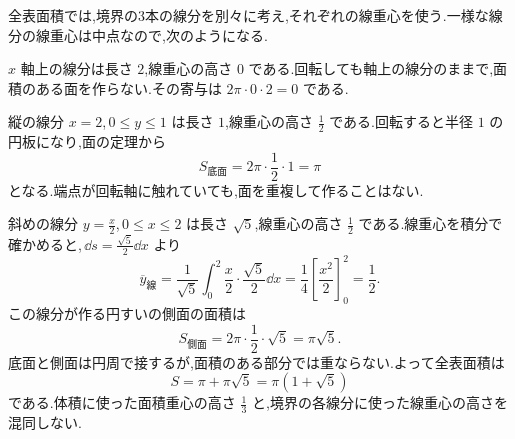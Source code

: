 全表面積では,境界の3本の線分を別々に考え,それぞれの線重心を使う.一様な線分の線重心は中点なので,次のようになる.

$x$ 軸上の線分は長さ $2$,線重心の高さ $0$ である.回転しても軸上の線分のままで,面積のある面を作らない.その寄与は $2\pi\cdot0\cdot2=0$ である.

縦の線分 $x=2$,\,$0\le y\le1$ は長さ $1$,線重心の高さ $\frac12$ である.回転すると半径 $1$ の円板になり,面の定理から
\[
S_{\mathrm{底面}}=2\pi\cdot\frac12\cdot1=\pi
\]
となる.端点が回転軸に触れていても,面を重複して作ることはない.

斜めの線分 $y=\frac{x}{2}$,\,$0\le x\le2$ は長さ $\sqrt5$,線重心の高さ $\frac12$ である.線重心を積分で確かめると,\,$\dd s=\frac{\sqrt5}{2}\dd x$ より
\[
\overline y_{\mathrm{線}}
 =\frac1{\sqrt5}\int_0^2\frac{x}{2}\cdot\frac{\sqrt5}{2}\dd x
 =\frac14\left[\frac{x^2}{2}\right]_0^2=\frac12.
\]
この線分が作る円すいの側面の面積は
\[
S_{\mathrm{側面}}=2\pi\cdot\frac12\cdot\sqrt5=\pi\sqrt5.
\]
底面と側面は円周で接するが,面積のある部分では重ならない.よって全表面積は
\[
S=\pi+\pi\sqrt5=\pi(1+\sqrt5)
\]
である.体積に使った面積重心の高さ $\frac13$ と,境界の各線分に使った線重心の高さを混同しない.
